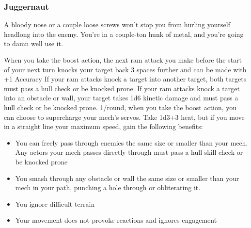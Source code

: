 \subsubsection{Juggernaut}

\begin{talent}
{A bloody nose or a couple loose screws won't stop you from hurling yourself headlong into the enemy. You're in a couple-ton hunk of metal, and you're going to damn well use it.}

When you take the boost action, the next ram attack you make before the start of your next turn knocks your target back 3 spaces further and can be made with +1 Accuracy
If your ram attacks knock a target into another target, both targets must pass a hull check or be knocked prone. If your ram attacks knock a target into an obstacle or wall, your target takes 1d6 kinetic damage and must pass a hull check or be knocked prone.
1/round, when you take the boost action, you can choose to supercharge your mech's servos. Take 1d3+3 heat, but if you move in a straight line your maximum speed, gain the following benefits: 
\begin{itemize}
\item You can freely pass through enemies the same size or smaller than your mech. Any actors your mech passes directly through must pass a hull skill check or be knocked prone 
\item You smash through any obstacle or wall the same size or smaller than your mech
in your path, punching a hole through or obliterating it.
\item You ignore difficult terrain
\item Your movement does not provoke reactions and ignores engagement
\end{itemize}
\end{talent}